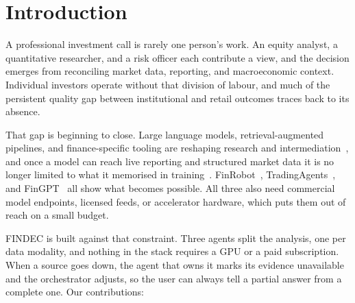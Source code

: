 \documentclass[conference]{IEEEtran}
\begin{document}
\section{Introduction}

A professional investment call is rarely one person's work. An equity analyst, a quantitative researcher, and a risk officer each contribute a view, and the decision emerges from reconciling market data, reporting, and macroeconomic context. Individual investors operate without that division of labour, and much of the persistent quality gap between institutional and retail outcomes traces back to its absence.

That gap is beginning to close. Large language models, retrieval-augmented pipelines, and finance-specific tooling are reshaping research and intermediation~\cite{aldasoro2025intelligent, khan2025bridging}, and once a model can reach live reporting and structured market data it is no longer limited to what it memorised in training~\cite{qin2024toolllm, sinha2026finbloom}. FinRobot~\cite{yang2024finrobot}, TradingAgents~\cite{xiao2024tradingagents}, and FinGPT~\cite{yang2023fingpt} all show what becomes possible. All three also need commercial model endpoints, licensed feeds, or accelerator hardware, which puts them out of reach on a small budget.

FINDEC is built against that constraint. Three agents split the analysis, one per data modality, and nothing in the stack requires a GPU or a paid subscription. When a source goes down, the agent that owns it marks its evidence unavailable and the orchestrator adjusts, so the user can always tell a partial answer from a complete one. Our contributions:
\end{document}
